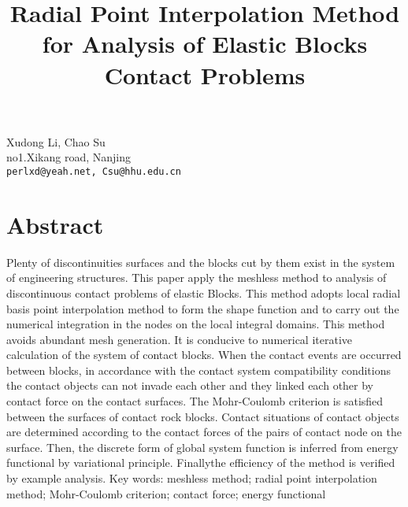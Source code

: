 \title{Radial Point Interpolation Method for Analysis of  Elastic Blocks Contact Problems}
\author{} \institute{}
\maketitle

\begin{center}
{\large Xudong Li, Chao Su}\\
no1.Xikang road, Nanjing\\
{\tt perlxd@yeah.net, Csu@hhu.edu.cn}
\end{center}

\section*{Abstract}
Plenty of discontinuities surfaces and the blocks cut by them exist in the system of engineering structures. This paper apply the meshless method to analysis of discontinuous contact problems of elastic Blocks. This method adopts local radial basis point interpolation method to form the shape function and to carry out the numerical integration in the nodes on the local integral domains. This method avoids abundant mesh generation. It is conducive to numerical iterative calculation of the system of contact blocks. When the contact events are occurred between blocks, in accordance with the contact system compatibility conditions the contact objects can not invade each other and they linked each other by contact force on the contact surfaces. The Mohr-Coulomb criterion is satisfied between the surfaces of contact rock blocks. Contact situations of contact objects are determined according to the contact forces of the pairs of contact node on the surface. Then, the discrete form of global system function is inferred from energy functional by variational principle. Finallythe efficiency of the method is verified by example analysis.
Key words: meshless method; radial point interpolation method; Mohr-Coulomb criterion; contact force; energy functional

